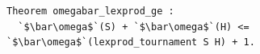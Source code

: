 \begin{lstlisting}[language=Rocq]
Theorem omegabar_lexprod_ge :
  `$\bar\omega$`(S) + `$\bar\omega$`(H) <= `$\bar\omega$`(lexprod_tournament S H) + 1.
\end{lstlisting}
